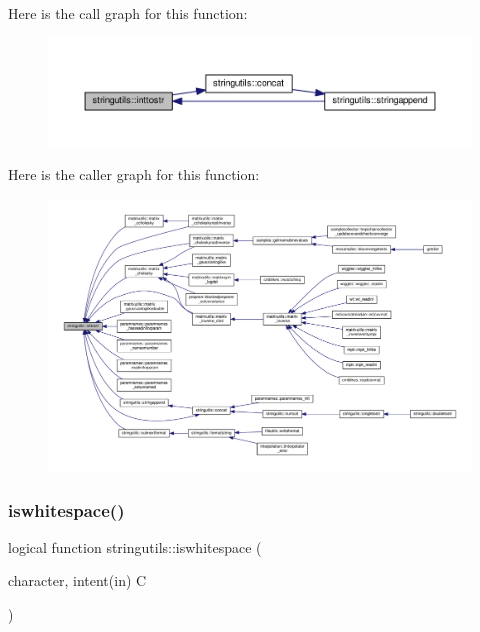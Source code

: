 Here is the call graph for this function\+:
\nopagebreak
\begin{figure}[H]
\begin{center}
\leavevmode
\includegraphics[width=350pt]{namespacestringutils_a8308d148fc2d1fd7e23aea926bfd837f_cgraph}
\end{center}
\end{figure}
Here is the caller graph for this function\+:
\nopagebreak
\begin{figure}[H]
\begin{center}
\leavevmode
\includegraphics[width=350pt]{namespacestringutils_a8308d148fc2d1fd7e23aea926bfd837f_icgraph}
\end{center}
\end{figure}
\mbox{\label{namespacestringutils_ae4eb174b5b8dcf64a0a61be0519ea343}} 
\subsubsection{\texorpdfstring{iswhitespace()}{iswhitespace()}}
{\footnotesize\ttfamily logical function stringutils\+::iswhitespace (\begin{DoxyParamCaption}\item[{character, intent(in)}]{C }\end{DoxyParamCaption})}



